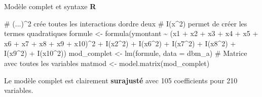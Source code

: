 \documentclass[
  ignorenonframetext,
]{beamer}
\newenvironment{Shaded}{\begin{snugshade}}{\end{snugshade}}
\newcommand{\AttributeTok}[1]{\textcolor[rgb]{0.40,0.45,0.13}{#1}}
\newcommand{\CommentTok}[1]{\textcolor[rgb]{0.37,0.37,0.37}{#1}}
\newcommand{\DecValTok}[1]{\textcolor[rgb]{0.68,0.00,0.00}{#1}}
\newcommand{\FunctionTok}[1]{\textcolor[rgb]{0.28,0.35,0.67}{#1}}
\newcommand{\NormalTok}[1]{\textcolor[rgb]{0.00,0.23,0.31}{#1}}
\newcommand{\OtherTok}[1]{\textcolor[rgb]{0.00,0.23,0.31}{#1}}
\newcommand{\SpecialCharTok}[1]{\textcolor[rgb]{0.37,0.37,0.37}{#1}}
\begin{document}
\begin{frame}[fragile]{Modèle complet et syntaxe \textbf{R}}
\protect\hypertarget{moduxe8le-complet-et-syntaxe-r}{}
\begin{Shaded}
\begin{Highlighting}[numbers=left,,]
\CommentTok{\# (...)\^{}2 crée toutes les interactions d\textquotesingle{}ordre deux}
\CommentTok{\# I(x\^{}2) permet de créer les termes quadratiques}
\NormalTok{formule }\OtherTok{\textless{}{-}} 
  \FunctionTok{formula}\NormalTok{(ymontant }\SpecialCharTok{\textasciitilde{}} 
\NormalTok{          (x1 }\SpecialCharTok{+}\NormalTok{ x2 }\SpecialCharTok{+}\NormalTok{ x3 }\SpecialCharTok{+}\NormalTok{ x4 }\SpecialCharTok{+}\NormalTok{ x5 }\SpecialCharTok{+} 
\NormalTok{             x6 }\SpecialCharTok{+}\NormalTok{ x7 }\SpecialCharTok{+}\NormalTok{ x8 }\SpecialCharTok{+}\NormalTok{ x9 }\SpecialCharTok{+}\NormalTok{ x10)}\SpecialCharTok{\^{}}\DecValTok{2} \SpecialCharTok{+} 
            \FunctionTok{I}\NormalTok{(x2}\SpecialCharTok{\^{}}\DecValTok{2}\NormalTok{) }\SpecialCharTok{+} \FunctionTok{I}\NormalTok{(x6}\SpecialCharTok{\^{}}\DecValTok{2}\NormalTok{) }\SpecialCharTok{+} \FunctionTok{I}\NormalTok{(x7}\SpecialCharTok{\^{}}\DecValTok{2}\NormalTok{) }\SpecialCharTok{+}
            \FunctionTok{I}\NormalTok{(x8}\SpecialCharTok{\^{}}\DecValTok{2}\NormalTok{) }\SpecialCharTok{+} \FunctionTok{I}\NormalTok{(x9}\SpecialCharTok{\^{}}\DecValTok{2}\NormalTok{) }\SpecialCharTok{+} \FunctionTok{I}\NormalTok{(x10}\SpecialCharTok{\^{}}\DecValTok{2}\NormalTok{))}
\NormalTok{mod\_complet }\OtherTok{\textless{}{-}} \FunctionTok{lm}\NormalTok{(formule, }\AttributeTok{data =}\NormalTok{ dbm\_a)}
\CommentTok{\# Matrice avec toutes les variables}
\NormalTok{matmod }\OtherTok{\textless{}{-}} \FunctionTok{model.matrix}\NormalTok{(mod\_complet)}
\end{Highlighting}
\end{Shaded}

Le modèle complet est clairement \textbf{surajusté} avec 105
coefficients pour 210 variables.
\end{frame}
\end{document}
